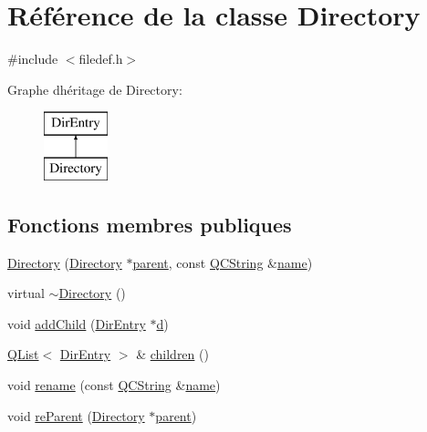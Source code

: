 \hypertarget{class_directory}{}\section{Référence de la classe Directory}
\label{class_directory}


{\ttfamily \#include $<$filedef.\+h$>$}

Graphe d\textquotesingle{}héritage de Directory\+:\begin{figure}[H]
\begin{center}
\leavevmode
\includegraphics[height=2.000000cm]{class_directory}
\end{center}
\end{figure}
\subsection*{Fonctions membres publiques}
\begin{DoxyCompactItemize}
\item 
\hyperlink{class_directory_aefd2e05e867b71968887512be13cb4f8}{Directory} (\hyperlink{class_directory}{Directory} $\ast$\hyperlink{class_dir_entry_a4bc3262d0c9a5aa23a6b6eba8414a05a}{parent}, const \hyperlink{class_q_c_string}{Q\+C\+String} \&\hyperlink{class_dir_entry_a4b1ef667119bd83d109f4cefa20ef4ea}{name})
\item 
virtual \hyperlink{class_directory_a91f2b79f7a0aa2f5aae46dad007224ad}{$\sim$\+Directory} ()
\item 
void \hyperlink{class_directory_ad94561c12fe8af1ed009d78b59edff2d}{add\+Child} (\hyperlink{class_dir_entry}{Dir\+Entry} $\ast$\hyperlink{060__command__switch_8tcl_af43f4b1f0064a33b2d662af9f06d3a00}{d})
\item 
\hyperlink{class_q_list}{Q\+List}$<$ \hyperlink{class_dir_entry}{Dir\+Entry} $>$ \& \hyperlink{class_directory_adc4ecc89e295d735cd208403e58291fd}{children} ()
\item 
void \hyperlink{class_directory_a98dbd078758078e150b7110c81d94362}{rename} (const \hyperlink{class_q_c_string}{Q\+C\+String} \&\hyperlink{class_dir_entry_a4b1ef667119bd83d109f4cefa20ef4ea}{name})
\item 
void \hyperlink{class_directory_a39eac963ed79a2b70501fac7442e4d28}{re\+Parent} (\hyperlink{class_directory}{Directory} $\ast$\hyperlink{class_dir_entry_a4bc3262d0c9a5aa23a6b6eba8414a05a}{parent})
\end{DoxyCompactItemize}
